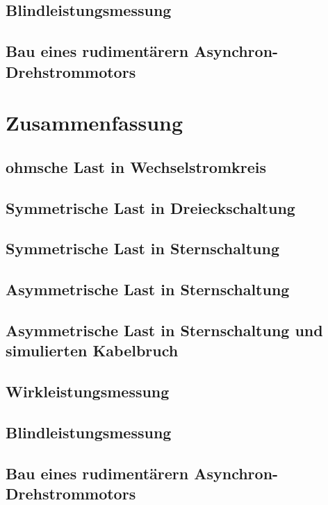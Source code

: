 \documentclass[12pt,english,ngerman]{scrartcl}
\begin{document}
\subsection{Blindleistungsmessung}


\subsection{Bau eines rudimentärern Asynchron-Drehstrommotors}

\section{Zusammenfassung}
\label{sec:zusammenfassung}

\subsection{ohmsche Last in Wechselstromkreis}


\subsection{Symmetrische Last in Dreieckschaltung}


\subsection{Symmetrische Last in Sternschaltung}


\subsection{Asymmetrische Last in Sternschaltung}


\subsection{Asymmetrische Last in Sternschaltung und simulierten Kabelbruch}


\subsection{Wirkleistungsmessung}


\subsection{Blindleistungsmessung}


\subsection{Bau eines rudimentärern Asynchron-Drehstrommotors}

\newpage

\printbibliography
\listoffigures
\listoftables
\end{document}
